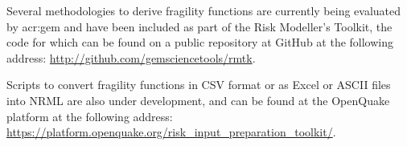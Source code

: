 Several methodologies to derive fragility functions are currently being
evaluated by \gls{acr:gem} and have been included as part of the Risk
Modeller's Toolkit, the code for which can be found on a public repository at
GitHub at the following address: 
\href{http://github.com/gemsciencetools/rmtk}{http://github.com/gemsciencetools/rmtk}.

Scripts to convert \glspl{fragility function} in CSV format or as Excel or
ASCII files into NRML are also under development, and can be found at the
OpenQuake platform at the following address:
\href{https://platform.openquake.org/risk_input_preparation_toolkit/}{https://platform.openquake.org/risk\_input\_preparation\_toolkit/}.
